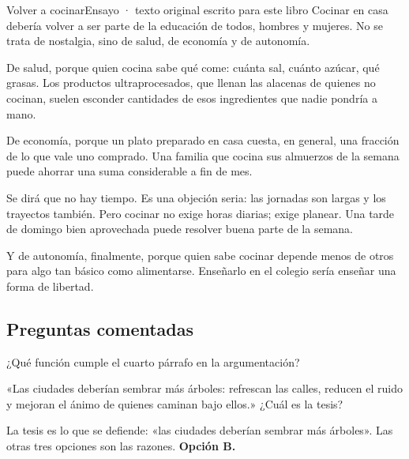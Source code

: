 \begin{texto}{Volver a cocinar}{Ensayo · texto original escrito para este libro}
\pa Cocinar en casa debería volver a ser parte de la educación de todos, hombres y mujeres. No se trata de nostalgia, sino
de salud, de economía y de autonomía.

\pa De salud, porque quien cocina sabe qué come: cuánta sal, cuánto azúcar, qué grasas. Los productos ultraprocesados,
que llenan las alacenas de quienes no cocinan, suelen esconder cantidades de esos ingredientes que nadie pondría a mano.

\pa De economía, porque un plato preparado en casa cuesta, en general, una fracción de lo que vale uno comprado. Una
familia que cocina sus almuerzos de la semana puede ahorrar una suma considerable a fin de mes.

\pa Se dirá que no hay tiempo. Es una objeción seria: las jornadas son largas y los trayectos también. Pero cocinar no
exige horas diarias; exige planear. Una tarde de domingo bien aprovechada puede resolver buena parte de la semana.

\pa Y de autonomía, finalmente, porque quien sabe cocinar depende menos de otros para algo tan básico como alimentarse.
Enseñarlo en el colegio sería enseñar una forma de libertad.
\end{texto}

\subsection{Preguntas comentadas}
\begin{comentada}{¿Qué función cumple el cuarto párrafo en la argumentación?}
\end{comentada}

\begin{reto}
«Las ciudades deberían sembrar más árboles: refrescan las calles, reducen el ruido y mejoran el ánimo de quienes caminan
bajo ellos.» ¿Cuál es la tesis?
\end{reto}

\begin{retoresuelto}
La tesis es lo que se defiende: «las ciudades deberían sembrar más árboles». Las otras tres opciones son las razones.
\textbf{Opción B.}
\end{retoresuelto}

